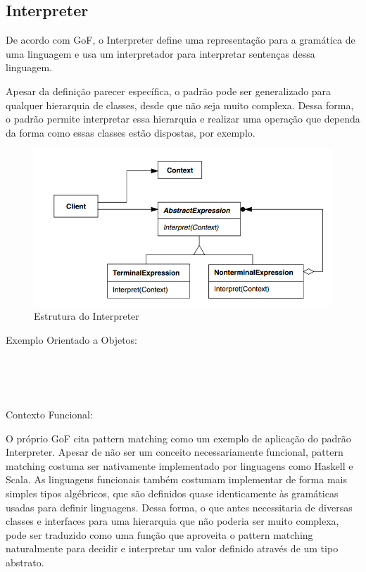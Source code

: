 \subsection{Interpreter}

De acordo com GoF, o Interpreter define uma representação para 
a gramática de uma linguagem e usa um interpretador para 
interpretar sentenças dessa linguagem.

Apesar da definição parecer específica, o padrão pode ser 
generalizado para qualquer hierarquia de classes, desde que 
não seja muito complexa. Dessa forma, o padrão permite 
interpretar essa hierarquia e realizar uma operação que 
dependa da forma como essas classes estão dispostas, por 
exemplo.

\begin{figure}[htb]
	\caption{\label{fig_grafico}Estrutura do Interpreter}
	\begin{center}
	    \includegraphics[scale=0.5]{5_padroes-contexto-funcional/5.3_comportamentais/5.3.03_interpreter/diagram.png}
	\end{center}
\end{figure}

Exemplo Orientado a Objetos:

\begin{lstlisting}[caption={Interpreter Orientação a Objetos},label=oointerpreter]


    
\end{lstlisting}

Contexto Funcional:

O próprio GoF cita pattern matching como um exemplo de 
aplicação do padrão Interpreter. Apesar de não ser um 
conceito necessariamente funcional, pattern matching costuma 
ser nativamente implementado por linguagens como Haskell e 
Scala. As linguagens funcionais também costumam implementar 
de forma mais simples tipos algébricos, que são definidos 
quase identicamente às gramáticas usadas para definir 
linguagens. Dessa forma, o que antes necessitaria de diversas 
classes e interfaces para uma hierarquia que não poderia 
ser muito complexa, pode ser traduzido como uma função 
que aproveita o pattern matching naturalmente para decidir 
e interpretar um valor definido através de um tipo abstrato.

\begin{lstlisting}[caption={Interpreter Funcional},label=fpinterpreter]
    

    
\end{lstlisting}